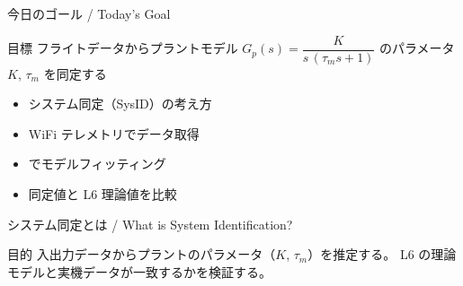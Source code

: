 
\begin{frame}{今日のゴール / Today's Goal}
  \begin{block}{目標}
    フライトデータからプラントモデル
    $G_p(s) = \dfrac{K}{s\,(\tau_m s + 1)}$
    のパラメータ $K$, $\tau_m$ を同定する
  \end{block}

  \vspace{1em}

  \begin{itemize}
    \item システム同定（SysID）の考え方
    \item WiFi テレメトリでデータ取得
    \item {} でモデルフィッティング
    \item 同定値と L6 理論値を比較
  \end{itemize}
\end{frame}

\begin{frame}{システム同定とは / What is System Identification?}
  \begin{center}
    \resizebox{0.85\textwidth}{!}{}
  \end{center}

  \vspace{0.5em}

  \begin{block}{目的}
    入出力データからプラントのパラメータ（$K$, $\tau_m$）を推定する。
    L6 の理論モデルと実機データが一致するかを検証する。
  \end{block}
\end{frame}

